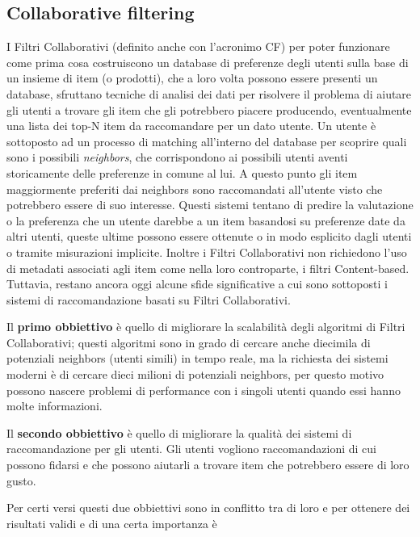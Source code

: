 \subsection{Collaborative filtering}
I Filtri Collaborativi (definito anche con l'acronimo CF) per poter funzionare come prima cosa costruiscono un database di preferenze 
degli utenti sulla base di un insieme di item (o prodotti), che a loro volta possono essere presenti un database, 
sfruttano tecniche di analisi dei dati per risolvere il problema di aiutare gli utenti a trovare gli item che gli potrebbero piacere 
producendo, eventualmente una lista dei top-N item da raccomandare per un dato utente.
Un utente è sottoposto ad un processo di matching all'interno del database per scoprire quali sono i possibili \textit{neighbors},
che corrispondono ai possibili utenti aventi storicamente delle preferenze in comune al lui. A questo punto gli item maggiormente 
preferiti dai neighbors sono raccomandati all'utente visto che potrebbero essere di suo interesse.\hfill\break
Questi sistemi tentano di predire la valutazione o la preferenza che un utente darebbe a un item basandosi su preferenze date da altri 
utenti, queste ultime possono essere ottenute o in modo esplicito dagli utenti o tramite misurazioni implicite.
Inoltre i Filtri Collaborativi non richiedono l'uso di metadati associati agli item come nella loro controparte, i filtri Content-based.\hfill\break
Tuttavia, restano ancora oggi alcune sfide significative a cui sono sottoposti i sistemi di raccomandazione basati su 
Filtri Collaborativi.
\begin{description}
    \item Il \textbf{primo obbiettivo} è quello di migliorare la scalabilità degli algoritmi di Filtri Collaborativi; questi algoritmi sono in grado di cercare 
    anche diecimila di potenziali neighbors (utenti simili) in tempo reale, ma la richiesta dei sistemi moderni è di cercare dieci milioni di 
    potenziali neighbors, per questo motivo possono nascere problemi di performance con i singoli utenti quando essi hanno molte informazioni.
    \item Il \textbf{secondo obbiettivo} è quello di migliorare la qualità dei sistemi di raccomandazione per gli utenti. Gli utenti vogliono 
    raccomandazioni di cui possono fidarsi e che possono aiutarli a trovare item che potrebbero essere di loro gusto.
\end{description}
Per certi versi questi due obbiettivi sono in conflitto tra di loro e per ottenere dei risultati validi e di una certa importanza è 
